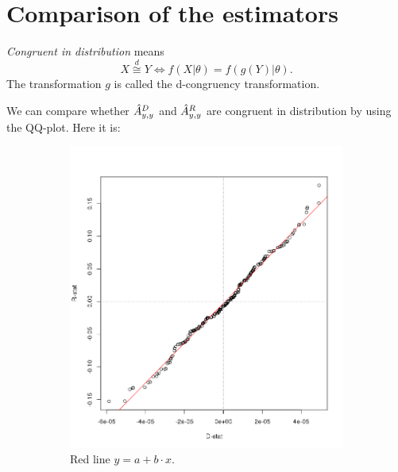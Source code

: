 \documentclass{article}
\newcommand{\congd}{\overset{d}{\cong}}
\begin{document}
\section{Comparison of the estimators}
\begin{Definition}
\emph{Congruent in distribution} means 
\[
	X \congd Y \Leftrightarrow f(X|\theta) = f(g(Y)|\theta).
\]
The transformation $g$ is called the d-congruency transformation.
\end{Definition}
We can compare whether $\Ayy*[D]$ and $\Ayy*[R]$ are congruent in distribution by using the QQ-plot. Here it is:
\begin{figure}[h]
\centering
\begin{subfigure}{.5\textwidth}
\includegraphics[scale=.5]{R_D_QQPlot}
\caption{Red line $y = a + b\cdot x$.}
\end{subfigure}~
\begin{subfigure}{.5\textwidth}

\end{subfigure}
\end{figure}
\end{document}
